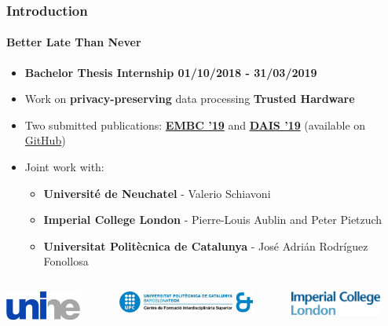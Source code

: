 \documentclass[10pt,    %
    english,            %
    xcolor=table,       %
    envcountsect,        %
    aspectratio=169     %
]{beamer}
\begin{document}
\begin{frame}
    \frametitle{Introduction}
    \framesubtitle{Better Late Than Never}

    \vspace{-25pt}

    \begin{itemize}
        \item \textbf{Bachelor Thesis Internship 01/10/2018 - 31/03/2019}
        \item Work on \textbf{\textcolor{fgRed}{privacy-preserving}} data processing \textrightarrow \textbf{Trusted Hardware}
        \item Two submitted publications: \href{https://github.csem.local/publications/embc2019-medspark}{\textbf{EMBC '19}} and \href{https://github.csem.local/publications/dais2019-medspark}{\textbf{DAIS '19}} (available on \href{https://github.csem.local/publications/}{GitHub})
        \item Joint work with:
        \begin{itemize}
            \item \textbf{Universit\'e de Neuchatel} - Valerio Schiavoni
            \item \textbf{Imperial College London} - Pierre-Louis Aublin and Peter Pietzuch
            \item \textbf{Universitat Polit\`ecnica de Catalunya} - Jos\'e Adri\'an Rodr\'iguez Fonollosa
        \end{itemize}
    \end{itemize}

    \vspace{15pt}

    \begin{columns}[b]
        \centering
        \begin{column}{.2\textwidth}
            \includegraphics[width=2.5cm]{images/unine-no-bg-no-letter.png}
        \end{column}
        \begin{column}{.2\textwidth}
            \hspace*{-30pt}\includegraphics[width=4.5cm]{images/cfis-upc-no-bg.png}
        \end{column}
        \begin{column}{.2\textwidth}
            \includegraphics[width=3cm]{images/imperial-college.png}
        \end{column}
    \end{columns}

\end{frame}
\end{document}

